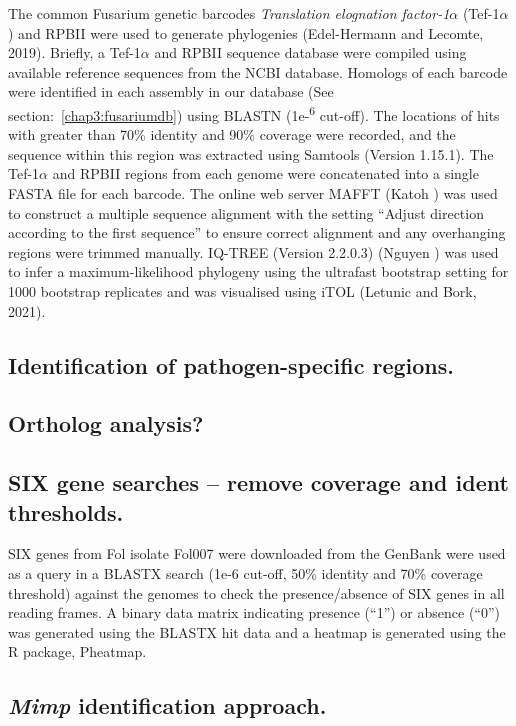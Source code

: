 The common Fusarium genetic barcodes \textit{Translation elognation factor-1\(\alpha\)} (Tef-1\(\alpha\)) and RPBII  were used to generate phylogenies (Edel-Hermann and Lecomte, 2019). Briefly, a Tef-1\(\alpha\) and RPBII sequence database were compiled using available reference sequences from the NCBI database. Homologs of each barcode were identified in each assembly in our database (See section:~\ref{chap3:fusariumdb}) using BLASTN (1e-\textsuperscript{6} cut-off). The locations of hits with greater than 70\% identity and 90\% coverage were recorded, and the sequence within this region was extracted using Samtools (Version 1.15.1). The Tef-1\(\alpha\) and RPBII regions from each genome were concatenated into a single FASTA file for each barcode. The online web server MAFFT (Katoh ) was used to construct a multiple sequence alignment with the setting “Adjust direction according to the first sequence” to ensure correct alignment and any overhanging regions were trimmed manually. IQ-TREE (Version 2.2.0.3) (Nguyen ) was used to infer a maximum-likelihood phylogeny using the ultrafast bootstrap setting for 1000 bootstrap replicates and was visualised using iTOL (Letunic and Bork, 2021). 

\subsection{Identification of pathogen-specific regions.}


\subsection{Ortholog analysis?}

\subsection{SIX gene searches – remove coverage and ident thresholds.}
SIX genes from Fol isolate Fol007 were downloaded from the GenBank were used as a query in a BLASTX search (1e-6 cut-off, 50\% identity and 70\% coverage threshold) against the genomes to check the presence/absence of SIX genes in all reading frames. A binary data matrix indicating presence (“1”) or absence (“0”) was generated using the BLASTX hit data and a heatmap is generated using the R package, Pheatmap.

\subsection{\textit{Mimp} identification approach.}

